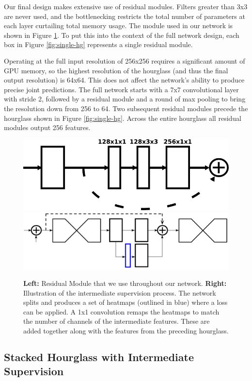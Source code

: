 \documentclass[runningheads]{llncs}
\begin{document}
Our final design makes extensive use of residual modules. Filters
greater than 3x3 are never used, and the bottlenecking restricts the
total number of parameters at each layer curtailing total memory
usage. The module used in our network is shown in Figure
\ref{fig:resid}. To put this into the context of the full network
design, each box in Figure \ref{fig:single-hg} represents a single
residual module.

Operating at the full input resolution of 256x256 requires a
significant amount of GPU memory, so the highest resolution of the
hourglass (and thus the final output resolution) is 64x64. This does
not affect the network's ability to produce precise joint
predictions. The full network starts with a 7x7 convolutional layer
with stride 2, followed by a residual module and a round of max
pooling to bring the resolution down from 256 to 64. Two subsequent
residual modules precede the hourglass shown in Figure
\ref{fig:single-hg}. Across the entire hourglass all residual modules
output 256 features.

\begin{figure}[t]
\centering
\includegraphics[width=.4\textwidth]{img/residual}
\hspace{.1in}
\includegraphics[width=.55\textwidth]{img/inter}
\caption{\textbf{Left:} Residual Module \cite{he2015deep} that we use
  throughout our network. \textbf{Right:} Illustration of the
  intermediate supervision process. The network splits and produces a set of
  heatmaps (outlined in blue) where a loss can be applied. A 1x1
  convolution remaps the heatmaps to match the number of channels of
  the intermediate features. These are added together along with the
  features from the preceding hourglass.}
\label{fig:resid}
\end{figure}
 
\subsection{Stacked Hourglass with Intermediate Supervision}
\end{document}

